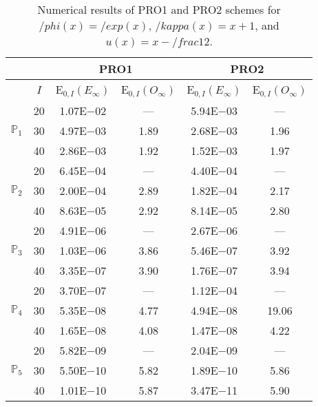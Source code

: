 \begin{table}[H]
\caption{Numerical results of PRO1 and PRO2 schemes for $/phi(x)=/exp(x)$, $/kappa(x)=x+1$, and $u(x)=x-/frac{1}{2}$.}
\setlength{\tabcolsep}{5pt}
\centering
\begin{tabular}{@{}l c c c c c@{}}
\toprule
 &  & \multicolumn{2}{c}{PRO1} & \multicolumn{2}{c}{PRO2}\\
\midrule
 & $I$ & E$_{0,I}(E_{\infty})$ & E$_{0,I}(O_{\infty})$ & E$_{0,I}(E_{\infty})$ & E$_{0,I}(O_{\infty})$\\
\midrule
\multirow{3}{*}{$\mathbb{P}_{1}$}
 & 20 & 1.07E$-$02 & --- & 5.94E$-$03 & ---\\
 & 30 & 4.97E$-$03 & 1.89 & 2.68E$-$03 & 1.96 \\
 & 40 & 2.86E$-$03 & 1.92 & 1.52E$-$03 & 1.97 \\
\midrule
\multirow{3}{*}{$\mathbb{P}_{2}$}
 & 20 & 6.45E$-$04 & --- & 4.40E$-$04 & ---\\
 & 30 & 2.00E$-$04 & 2.89 & 1.82E$-$04 & 2.17 \\
 & 40 & 8.63E$-$05 & 2.92 & 8.14E$-$05 & 2.80 \\
\midrule
\multirow{3}{*}{$\mathbb{P}_{3}$}
 & 20 & 4.91E$-$06 & --- & 2.67E$-$06 & ---\\
 & 30 & 1.03E$-$06 & 3.86 & 5.46E$-$07 & 3.92 \\
 & 40 & 3.35E$-$07 & 3.90 & 1.76E$-$07 & 3.94 \\
\midrule
\multirow{3}{*}{$\mathbb{P}_{4}$}
 & 20 & 3.70E$-$07 & --- & 1.12E$-$04 & ---\\
 & 30 & 5.35E$-$08 & 4.77 & 4.94E$-$08 & 19.06 \\
 & 40 & 1.65E$-$08 & 4.08 & 1.47E$-$08 & 4.22 \\
\midrule
\multirow{3}{*}{$\mathbb{P}_{5}$}
 & 20 & 5.82E$-$09 & --- & 2.04E$-$09 & ---\\
 & 30 & 5.50E$-$10 & 5.82 & 1.89E$-$10 & 5.86 \\
 & 40 & 1.01E$-$10 & 5.87 & 3.47E$-$11 & 5.90 \\
\bottomrule
\end{tabular}
\label{Table:PRO:Test8}
\end{table}
